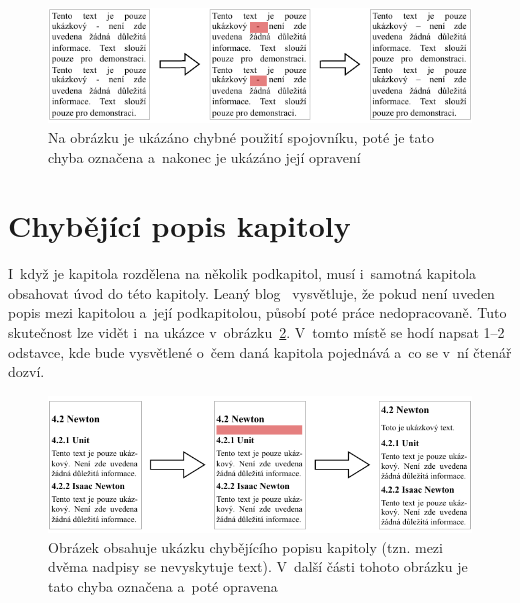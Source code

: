 \begin{figure}[H]
    \centering
    \includegraphics[width=\linewidth]{obrazky-figures/dash_example.pdf}
    \caption{
        Na obrázku je ukázáno chybné použití spojovníku, poté je tato chyba
        označena a~nakonec je ukázáno její opravení
    }
    \label{pic_hyphen}
\end{figure}


\section{Chybějící popis kapitoly}

I~když je kapitola rozdělena na několik podkapitol, musí i~samotná kapitola
obsahovat úvod do této kapitoly. Leaný blog~\cite{Leany_blog} vysvětluje, že 
pokud není uveden
popis mezi kapitolou a~její podkapitolou, působí poté práce nedopracovaně. Tuto
skutečnost lze vidět i~na ukázce v~obrázku~\ref{pic_chapter_introduction}. V~tomto místě
se hodí napsat 1--2 odstavce, kde bude vysvětlené o~čem daná kapitola pojednává a~co se
v~ní čtenář dozví.

\begin{figure}[H]
    \centering
    \includegraphics[width=\linewidth]{obrazky-figures/chapter_introduction_example.pdf}
    \caption{
        Obrázek obsahuje ukázku chybějícího popisu kapitoly (tzn. mezi dvěma
        nadpisy se nevyskytuje text). V~další části tohoto obrázku je tato 
        chyba označena a~poté opravena
    }
    \label{pic_chapter_introduction}
\end{figure}


